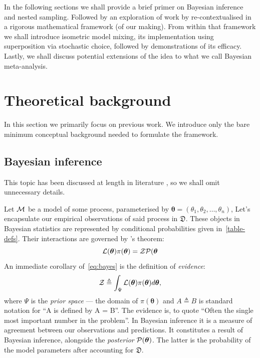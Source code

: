 \documentclass[usenatbib]{mnras}
\begin{document}
In the following sections we shall provide a brief primer on Bayesian
inference and nested sampling. Followed by an exploration of work by
\cite{chen-ferroz-hobson} re-contextualised in a rigorous mathematical
framework (of our making). From within that framework we shall
introduce isometric model mixing, its implementation using
superposition via stochastic choice, followed by demonstrations of its
efficacy. Lastly, we shall discuss potential extensions of the idea to
what we call Bayesian meta-analysis.

\section{Theoretical background}\label{sec:orge6061a4}
In this section we primarily focus on previous work. We introduce only
the bare minimum conceptual background needed to formulate the
framework.

\subsection{Bayesian inference}\label{sec:primer}

This topic has been discussed at length in literature
\citep{jeffreys2010scientific}, so we shall omit unnecessary details.

Let \({\cal M}\) be a model of some process, parameterised by
\(\bm{\theta} = (\theta_{1}, \theta_{2}, \ldots , \theta_{n})\), Let's
encapsulate our empirical observations of said process in
\(\mathfrak{D}\).  These objects in Bayesian statistics are
represented by conditional probabilities given
in~\cref{table-defs}. Their interactions are governed by
\citeauthor{1763}'s theorem:
\begin{equation}\label{eq:bayes} 
 {\cal L}(\bm{\theta})  \pi (\bm{\theta}) = {\cal Z}  {\cal P} (\bm{\theta}
\end{equation}
An immediate corollary of~\cref{eq:bayes} is the definition of \emph{evidence}:
\begin{equation}\label{eq:def-z}
 {\cal Z} \triangleq \int_{\Psi} {\cal L}(\bm{\theta}) \pi(\bm{\theta}) d\bm{\theta}, 
\end{equation}
where \(\Psi\) is the \emph{prior space} --- the domain of
\(\pi(\bm{\theta})\) and \(A \triangleq B\) is standard notation for
``A is defined by A = B''. The evidence is, to quote
\cite{importanceOfZ} ``Often the single most important number in the
problem''. In Bayesian inference it is a measure of agreement between
our observations and predictions. It constitutes a result of Bayesian
inference, alongside the \emph{posterior} \({\cal
  P}(\bm{\theta})\). The latter is the probability of the model
parameters after accounting for \(\mathfrak{D}\). 
\end{document}
